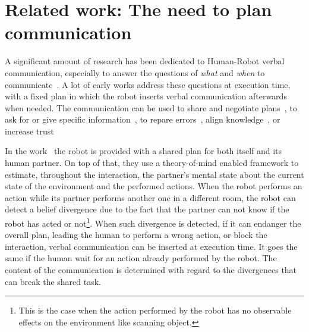 \section[Related work]{Related work: The need to plan communication}

A significant amount of research has been dedicated to Human-Robot verbal communication, especially to answer the questions of \textit{what} and \textit{when} to communicate~\cite{mavridis_2015_review}. A lot of early works address these questions at execution time, with a fixed plan in which the robot inserts verbal communication afterwards when needed. The communication can be used to share and negotiate plans~\cite{sebastiani_2017_dealing}, to ask for or give specific information~\cite{shah_2011_improved}, to repare errors~\cite{tellex_2014_asking}, align knowledge~\cite{devin_2016_implemented}, or increase trust~\cite{schaefer_2017_communicating}

In the work~\cite{devin_2016_implemented} the robot is provided with a shared plan for both itself and its human partner. On top of that, they use a theory-of-mind enabled framework to estimate, throughout the interaction, the partner's mental state about the current state of the environment and the performed actions. When the robot performs an action while its partner performs another one in a different room, the robot can detect a belief divergence due to the fact that the partner can not know if the robot has acted or not\footnote{This is the case when the action performed by the robot has no observable effects on the environment like scanning object.}. When such divergence is detected, if it can endanger the overall plan, leading the human to perform a wrong action, or block the interaction, verbal communication can be inserted at execution time. It goes the same if the human wait for an action already performed by the robot. The content of the communication is determined with regard to the divergences that can break the shared task.

